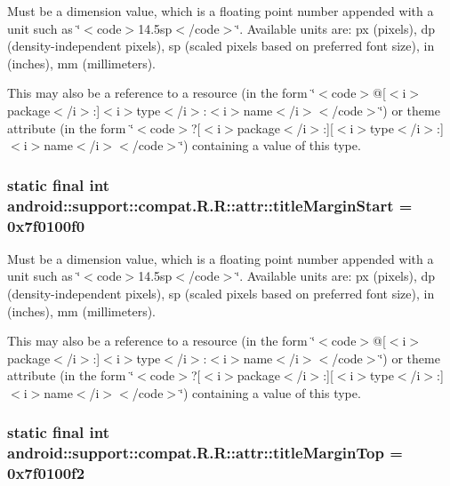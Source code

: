 Must be a dimension value, which is a floating point number appended with a unit such as \char`\"{}$<$code$>$14.5sp$<$/code$>$\char`\"{}. Available units are: px (pixels), dp (density-independent pixels), sp (scaled pixels based on preferred font size), in (inches), mm (millimeters). 

This may also be a reference to a resource (in the form \char`\"{}$<$code$>$@\mbox{[}$<$i$>$package$<$/i$>$:\mbox{]}$<$i$>$type$<$/i$>$:$<$i$>$name$<$/i$>$$<$/code$>$\char`\"{}) or theme attribute (in the form \char`\"{}$<$code$>$?\mbox{[}$<$i$>$package$<$/i$>$:\mbox{]}\mbox{[}$<$i$>$type$<$/i$>$:\mbox{]}$<$i$>$name$<$/i$>$$<$/code$>$\char`\"{}) containing a value of this type. \hypertarget{classandroid_1_1support_1_1compat_1_1_r_1_1attr_cc07b4d41feac6ed5e746fb50f50a1e6}{
\subsubsection[{titleMarginStart}]{\setlength{\rightskip}{0pt plus 5cm}static final int android::support::compat.R.R::attr::titleMarginStart = 0x7f0100f0}}
\label{classandroid_1_1support_1_1compat_1_1_r_1_1attr_cc07b4d41feac6ed5e746fb50f50a1e6}


Must be a dimension value, which is a floating point number appended with a unit such as \char`\"{}$<$code$>$14.5sp$<$/code$>$\char`\"{}. Available units are: px (pixels), dp (density-independent pixels), sp (scaled pixels based on preferred font size), in (inches), mm (millimeters). 

This may also be a reference to a resource (in the form \char`\"{}$<$code$>$@\mbox{[}$<$i$>$package$<$/i$>$:\mbox{]}$<$i$>$type$<$/i$>$:$<$i$>$name$<$/i$>$$<$/code$>$\char`\"{}) or theme attribute (in the form \char`\"{}$<$code$>$?\mbox{[}$<$i$>$package$<$/i$>$:\mbox{]}\mbox{[}$<$i$>$type$<$/i$>$:\mbox{]}$<$i$>$name$<$/i$>$$<$/code$>$\char`\"{}) containing a value of this type. \hypertarget{classandroid_1_1support_1_1compat_1_1_r_1_1attr_f8ab5b600e35a482ab1c78822d570936}{
\subsubsection[{titleMarginTop}]{\setlength{\rightskip}{0pt plus 5cm}static final int android::support::compat.R.R::attr::titleMarginTop = 0x7f0100f2}}
\label{classandroid_1_1support_1_1compat_1_1_r_1_1attr_f8ab5b600e35a482ab1c78822d570936}


